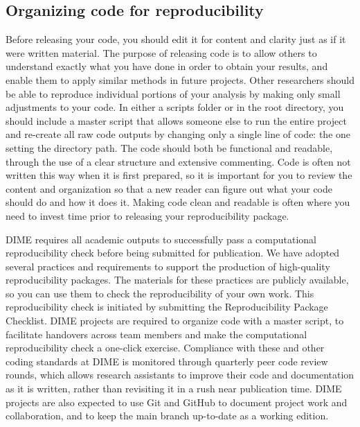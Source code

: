 \subsection{Organizing code for reproducibility}

Before releasing your code, you should edit it for content and clarity
just as if it were written material.
The purpose of releasing code is to allow others to understand
exactly what you have done in order to obtain your results,
and enable them to apply similar methods in future projects.
Other researchers should be able to reproduce individual portions of your analysis
by making only small adjustments to your code.
In either a scripts folder or in the root directory,
you should include a master script that allows someone else to run the entire project
and re-create all raw code outputs by changing only a single line of code:
the one setting the directory path.
The code should both be functional and readable,
through the use of a clear structure and extensive commenting.
Code is often not written this way when it is first prepared,
so it is important for you to review the content and organization
so that a new reader can figure out what your code should do and how it does it.
Making code clean and readable is often where you need to invest time prior to releasing your reproducibility package.

DIME requires all academic outputs to successfully pass a computational reproducibility check
before being submitted for publication.
We have adopted several practices and requirements to support the production
of high-quality reproducibility packages.
The materials for these practices are publicly available,
so you can use them to check the reproducibility of your own work.
This reproducibility check is initiated by submitting the Reproducibility Package Checklist.
DIME projects are required to organize code
with a master script, to facilitate handovers across team members
and make the computational reproducibility check a one-click exercise.
Compliance with these and other coding standards at DIME is monitored through
quarterly peer code review rounds, which allows research assistants to improve their code and documentation as it is written,
rather than revisiting it in a rush near publication time.
DIME projects are also expected to use Git and GitHub
to document project work and collaboration,
and to keep the main branch up-to-date as a working edition.

